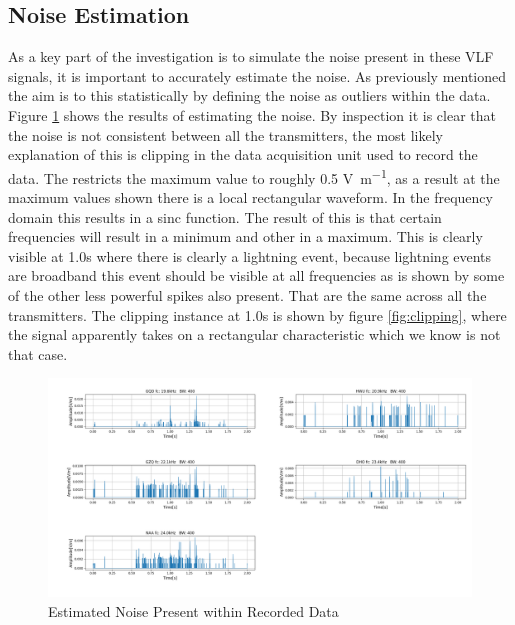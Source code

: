 \subsection{Noise Estimation}\label{sec:noiseEst}
As a key part of the investigation is to simulate the noise present in these VLF signals, it is important to accurately estimate the noise. As previously mentioned the aim is to this statistically by defining the noise as outliers within the data. Figure \ref{fig:noise estimate} shows the results of estimating the noise. By inspection it is clear that the noise is not consistent between all the transmitters, the most likely explanation of this is clipping in the data acquisition unit used to record the data. The restricts the maximum value to roughly 0.5 \si{\volt \per\metre}, as a result at the maximum values shown there is a local rectangular waveform. In the frequency domain this results in a sinc function. The result of this is that certain frequencies will result in a minimum and other in a maximum. This is clearly visible at 1.0\si{\second} where there is clearly a lightning event, because lightning events are broadband this event should be visible at all frequencies as is shown by some of the other less powerful spikes also present. That are the same across all the transmitters. The clipping instance at 1.0\si{\second} is shown by figure \ref{fig:clipping}, where the signal apparently takes on a rectangular characteristic which we know is not that case.

\begin{figure}[h!]
    \centering
    \includegraphics[width = \textwidth]{figs/sig_character/noiseEstimate.png}
    \caption{Estimated Noise Present within Recorded Data}
    \label{fig:noise estimate}
\end{figure}

